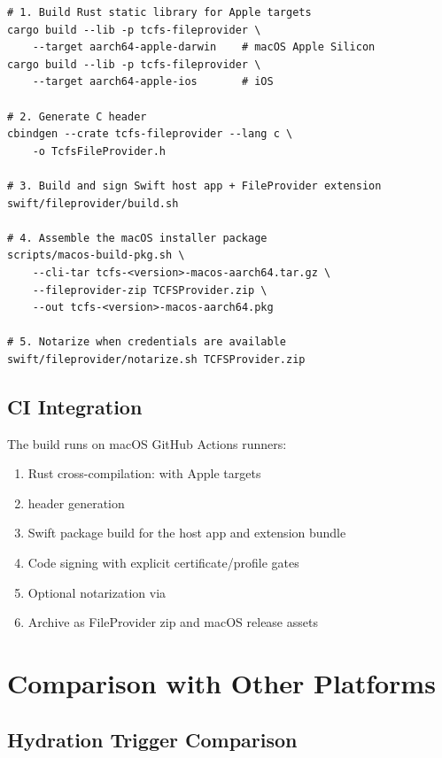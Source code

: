 \documentclass[11pt,a4paper]{article}
\begin{document}
\begin{lstlisting}[language={},title={Build steps}]
# 1. Build Rust static library for Apple targets
cargo build --lib -p tcfs-fileprovider \
    --target aarch64-apple-darwin    # macOS Apple Silicon
cargo build --lib -p tcfs-fileprovider \
    --target aarch64-apple-ios       # iOS

# 2. Generate C header
cbindgen --crate tcfs-fileprovider --lang c \
    -o TcfsFileProvider.h

# 3. Build and sign Swift host app + FileProvider extension
swift/fileprovider/build.sh

# 4. Assemble the macOS installer package
scripts/macos-build-pkg.sh \
    --cli-tar tcfs-<version>-macos-aarch64.tar.gz \
    --fileprovider-zip TCFSProvider.zip \
    --out tcfs-<version>-macos-aarch64.pkg

# 5. Notarize when credentials are available
swift/fileprovider/notarize.sh TCFSProvider.zip
\end{lstlisting}

\subsection{CI Integration}

The build runs on macOS GitHub Actions runners:

\begin{enumerate}
  \item Rust cross-compilation:  with Apple targets
  \item \code{cbindgen} header generation
  \item Swift package build for the host app and extension bundle
  \item Code signing with explicit certificate/profile gates
  \item Optional notarization via 
  \item Archive as FileProvider zip and macOS  release assets
\end{enumerate}

\section{Comparison with Other Platforms}

\subsection{Hydration Trigger Comparison}
\end{document}
